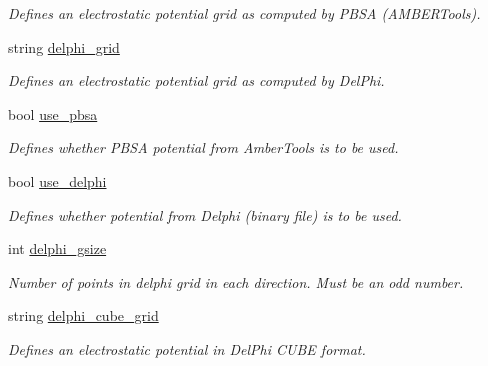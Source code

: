 \begin{DoxyCompactItemize}
\begin{DoxyCompactList}\small\item\em Defines an electrostatic potential grid as computed by PBSA (AMBERTools). \item\end{DoxyCompactList}\item 
\hypertarget{classPARSER_a9a5fa2d02d97a78c0e1bb54fc17c255e}{
string \hyperlink{classPARSER_a9a5fa2d02d97a78c0e1bb54fc17c255e}{delphi\_\-grid}}
\label{classPARSER_a9a5fa2d02d97a78c0e1bb54fc17c255e}

\begin{DoxyCompactList}\small\item\em Defines an electrostatic potential grid as computed by DelPhi. \item\end{DoxyCompactList}\item 
\hypertarget{classPARSER_adab1d9d9c728204a257bf57ca844481a}{
bool \hyperlink{classPARSER_adab1d9d9c728204a257bf57ca844481a}{use\_\-pbsa}}
\label{classPARSER_adab1d9d9c728204a257bf57ca844481a}

\begin{DoxyCompactList}\small\item\em Defines whether PBSA potential from AmberTools is to be used. \item\end{DoxyCompactList}\item 
\hypertarget{classPARSER_a88e14ebcae2cc1a70f27dcfe65cab06b}{
bool \hyperlink{classPARSER_a88e14ebcae2cc1a70f27dcfe65cab06b}{use\_\-delphi}}
\label{classPARSER_a88e14ebcae2cc1a70f27dcfe65cab06b}

\begin{DoxyCompactList}\small\item\em Defines whether potential from Delphi (binary file) is to be used. \item\end{DoxyCompactList}\item 
\hypertarget{classPARSER_a61400eb6ce0793897de321cddb1716f9}{
int \hyperlink{classPARSER_a61400eb6ce0793897de321cddb1716f9}{delphi\_\-gsize}}
\label{classPARSER_a61400eb6ce0793897de321cddb1716f9}

\begin{DoxyCompactList}\small\item\em Number of points in delphi grid in each direction. Must be an odd number. \item\end{DoxyCompactList}\item 
\hypertarget{classPARSER_a14e5d5f52a940a99e4452aaf9925ce4a}{
string \hyperlink{classPARSER_a14e5d5f52a940a99e4452aaf9925ce4a}{delphi\_\-cube\_\-grid}}
\label{classPARSER_a14e5d5f52a940a99e4452aaf9925ce4a}

\begin{DoxyCompactList}\small\item\em Defines an electrostatic potential in DelPhi CUBE format. \item\end{DoxyCompactList}\end{DoxyCompactItemize}


